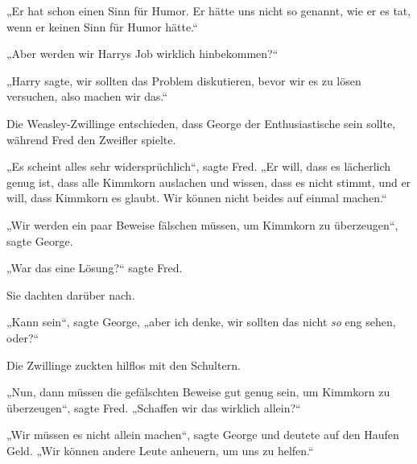 „Er hat schon einen Sinn für Humor. Er hätte uns nicht so genannt, wie er es tat, wenn er keinen Sinn für Humor hätte.“

„Aber werden wir Harrys Job wirklich hinbekommen?“

„Harry sagte, wir sollten das Problem diskutieren, bevor wir es zu lösen versuchen, also machen wir das.“

Die Weasley-Zwillinge entschieden, dass George der Enthusiastische sein sollte, während Fred den Zweifler spielte.

„Es scheint alles sehr widersprüchlich“, sagte Fred.
„Er will, dass es lächerlich genug ist, dass alle Kimmkorn auslachen und wissen, dass es nicht stimmt, und er will, dass Kimmkorn es glaubt. Wir können nicht beides auf einmal machen.“

„Wir werden ein paar Beweise fälschen müssen, um Kimmkorn zu überzeugen“, sagte George.

„War das eine Lösung?“ sagte Fred.

Sie dachten darüber nach.

„Kann sein“, sagte George, „aber ich denke, wir sollten das nicht \emph{so} eng sehen, oder?“

Die Zwillinge zuckten hilflos mit den Schultern.

„Nun, dann müssen die gefälschten Beweise gut genug sein, um Kimmkorn zu überzeugen“, sagte Fred.
„Schaffen wir das wirklich allein?“

„Wir müssen es nicht allein machen“, sagte George und deutete auf den Haufen Geld.
„Wir können andere Leute anheuern, um uns zu helfen.“

